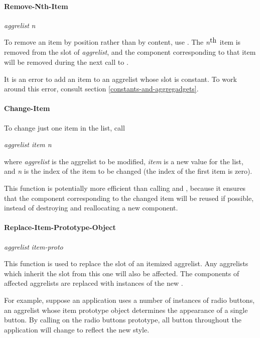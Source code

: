 \paragraph{Remove-Nth-Item}

 {\it aggrelist} {\it n}\value{method}

To remove an item by position rather than by content, use
.  The {\it n}$^{\hbox{th}}$ item is removed from
the  slot of {\it aggrelist}, and the component corresponding
to that item will be removed during the next call to .

It is an error to add an
item to an aggrelist whose  slot is constant.  To work around
this error, consult section \ref{constants-and-aggregadgets}.


\paragraph{Change-Item}

To change just one item in the  list, call

 {\it aggrelist item n}\value{method}

where {\it aggrelist} is the aggrelist to be modified, {\it item} is a
new value for the  list, and {\it n} is the index of the
item to be changed (the index of the first item is zero).

This function is potentially more efficient than calling  and
, because it ensures that the component corresponding to the
changed item will be reused if possible, instead of destroying and reallocating
a new component.


\paragraph{Replace-Item-Prototype-Object}

 {\it aggrelist} {\it item-proto}\value{method}

This function is used to replace the  slot of
an itemized aggrelist.  Any aggrelists which inherit
the slot from this one will also be affected.  The components of affected
aggrelists are replaced with instances of the new
.

For example, suppose an application uses a number of instances
of  radio buttons,
an aggrelist whose item prototype object
determines the appearance of a single button.  By calling
 on the radio buttons prototype,
all button throughout the application will change to reflect the
new style.

